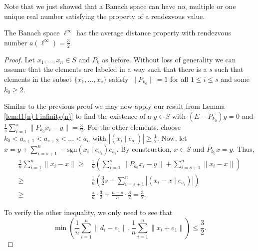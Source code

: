 Note that we just showed that a Banach space can have no, multiple or one unique real number satisfying the property of a rendezvous value.

\begin{theorem}\cite{wolf:spheres}
	The Banach space $\ell^\infty$ has the average distance property with rendezvous number $a(\ell^\infty)=\frac{3}{2}$.
\end{theorem}

\begin{proof} 
		Let $x_1,\dots,x_n\in S$ and $P_k$ as before. Without loss of generality we can assume that the elements are labeled in a way such that there is a $s$ such that elements in the subset $\{x_1,\dots,x_s\}$ satisfy $\|P_{k_0}\|=1$ for all $1\leq i\leq s$ and some $k_0\geq 2$.
		
		Similar to the previous proof we may now apply our result from Lemma \ref{lem:l1(n)-l-infinity(n)} to find the existence of a $y\in S$ with $(E-P_{k_0})y=0$ and $\frac{1}{s}\sum_{i=1}^{s}\|P_{k_0}x_i-y\|=\frac{3}{2}$. For the other elements, choose $k_0<a_{s+1}<a_{s+2}<\dots<a_n$ with $|(x_i\mid e_{a_i})|\geq\frac{1}{2}$. Now, let $x=y+\sum_{i=s+1}^n-\mathrm{sgn}(x_i\mid e_{a_i})e_{a_i}$. By construction, $x\in S$ and $P_{k_0}x=y$. Thus,
		\begin{align*}
				\frac{1}{n}\sum_{i=1}^n\|x_i-x\|\geq&\frac{1}{n}\left(\sum_{i=1}^s\|P_{k_0}x_i-y\|+\sum_{i=s+1}^n\|x_i-x\|\right)
				\\
				\geq& \frac{1}{n}\left(\frac{3}{2}s+\sum_{i=s+1}^n|(x_i-x\mid e_{a_i})|\right)
				\\
				\geq& \frac{s}{n}\cdot \frac{3}{2}+\frac{n-s}{n}\cdot \frac{3}{2}=\frac{3}{2}.
		\end{align*}
		
		To verify the other inequality, we only need to see that
		\[
		\min\left(\frac{1}{n}\sum_{i=1}^n\|d_i-e_1\|,\frac{1}{n}\sum_{i=1}^n\|x_i+e_1\|\right)\leq \frac{3}{2}.
		\]
		

\end{proof}
